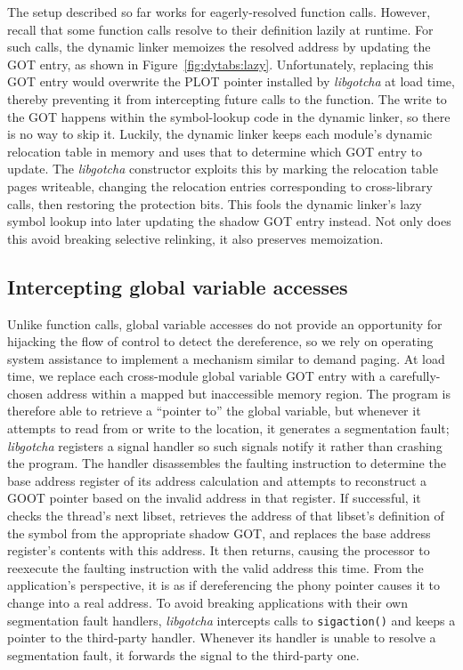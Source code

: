 The setup described so far works for eagerly-resolved function calls.  However,
recall that some function calls resolve to their definition lazily at runtime.  For
such calls, the dynamic linker memoizes the resolved address by updating the GOT
entry, as shown in Figure~\ref{fig:dytabs:lazy}.  Unfortunately, replacing this GOT
entry would overwrite the PLOT pointer installed by \textit{libgotcha} at load time,
thereby preventing it from intercepting future calls to the function.  The write to
the GOT happens within the symbol-lookup code in the dynamic linker, so there is no
way to skip it.  Luckily, the dynamic linker keeps each module's dynamic relocation
table in memory and uses that to determine which GOT entry to update.  The
\textit{libgotcha} constructor exploits this by marking the relocation table pages
writeable, changing the relocation entries corresponding to cross-library calls, then
restoring the protection bits.  This fools the dynamic linker's lazy symbol lookup
into later updating the shadow GOT entry instead.  Not only does this avoid breaking
selective relinking, it also preserves memoization.


\subsection{Intercepting global variable accesses}

Unlike function calls, global variable accesses do not provide an opportunity for
hijacking the flow of control to detect the dereference, so we rely on operating
system assistance to implement a mechanism similar to demand paging.  At load time,
we replace each cross-module global variable GOT entry with a carefully-chosen
address within a mapped but inaccessible memory region.  The program is therefore
able to retrieve a ``pointer to'' the global variable, but whenever it attempts to
read from or write to the location, it generates a segmentation fault;
\textit{libgotcha} registers a signal handler so such signals notify it rather than
crashing the program.  The handler disassembles the faulting instruction to determine
the base address register of its address calculation and attempts to reconstruct a
GOOT pointer based on the invalid address in that register.  If successful, it checks
the thread's next libset, retrieves the address of that libset's definition of the
symbol from the appropriate shadow GOT, and replaces the base address register's
contents with this address.  It then returns, causing the processor to reexecute the
faulting instruction with the valid address this time.  From the application's
perspective, it is as if dereferencing the phony pointer causes it to change into a
real address.  To avoid breaking applications with their own segmentation fault
handlers, \textit{libgotcha} intercepts calls to \texttt{sigaction()} and keeps a
pointer to the third-party handler.  Whenever its handler is unable to resolve a
segmentation fault, it forwards the signal to the third-party one.

